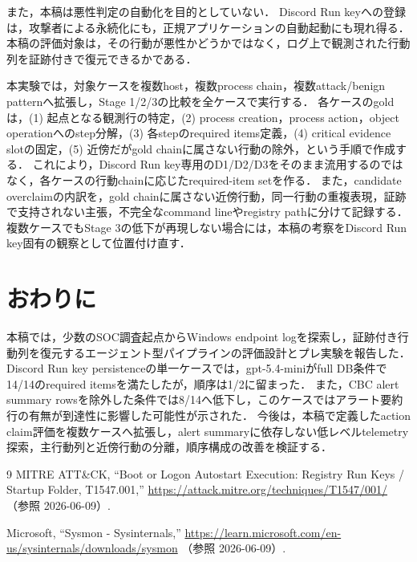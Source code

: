 \documentclass[a4paper,twocolumn,10pt]{ltjsarticle}
\begin{document}
また，本稿は悪性判定の自動化を目的としていない．
Discord Run keyへの登録は，攻撃者による永続化にも，正規アプリケーションの自動起動にも現れ得る．
本稿の評価対象は，その行動が悪性かどうかではなく，ログ上で観測された行動列を証跡付きで復元できるかである．

本実験では，対象ケースを複数host，複数process chain，複数attack/benign patternへ拡張し，Stage 1/2/3の比較を全ケースで実行する．
各ケースのgoldは，(1) 起点となる観測行の特定，(2) process creation，process action，object operationへのstep分解，(3) 各stepのrequired items定義，(4) critical evidence slotの固定，(5) 近傍だがgold chainに属さない行動の除外，という手順で作成する．
これにより，Discord Run key専用のD1/D2/D3をそのまま流用するのではなく，各ケースの行動chainに応じたrequired-item setを作る．
また，candidate overclaimの内訳を，gold chainに属さない近傍行動，同一行動の重複表現，証跡で支持されない主張，不完全なcommand lineやregistry pathに分けて記録する．
複数ケースでもStage 3の低下が再現しない場合には，本稿の考察をDiscord Run key固有の観察として位置付け直す．

\section{おわりに}

本稿では，少数のSOC調査起点からWindows endpoint logを探索し，証跡付き行動列を復元するエージェント型パイプラインの評価設計とプレ実験を報告した．
Discord Run key persistenceの単一ケースでは，gpt-5.4-miniがfull DB条件で14/14のrequired itemsを満たしたが，順序は1/2に留まった．
また，CBC alert summary rowsを除外した条件では8/14へ低下し，このケースではアラート要約行の有無が到達性に影響した可能性が示された．
今後は，本稿で定義したaction claim評価を複数ケースへ拡張し，alert summaryに依存しない低レベルtelemetry探索，主行動列と近傍行動の分離，順序構成の改善を検証する．

\begin{thebibliography}{9}
MITRE ATT\&CK,
``Boot or Logon Autostart Execution: Registry Run Keys / Startup Folder, T1547.001,''
\url{https://attack.mitre.org/techniques/T1547/001/}
（参照 2026-06-09）.

Microsoft,
``Sysmon - Sysinternals,''
\url{https://learn.microsoft.com/en-us/sysinternals/downloads/sysmon}
（参照 2026-06-09）.
\end{thebibliography}
\end{document}
